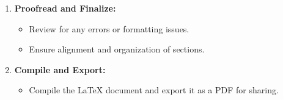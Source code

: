 \documentclass[a4paper,12pt]{article}
\begin{document}
\begin{enumerate}
    \item \textbf{Proofread and Finalize:}
    \begin{itemize}
        \item Review for any errors or formatting issues.
        \item Ensure alignment and organization of sections.
    \end{itemize}

    \item \textbf{Compile and Export:}
    \begin{itemize}
        \item Compile the LaTeX document and export it as a PDF for sharing.
    \end{itemize}
\end{enumerate}
\end{document}

